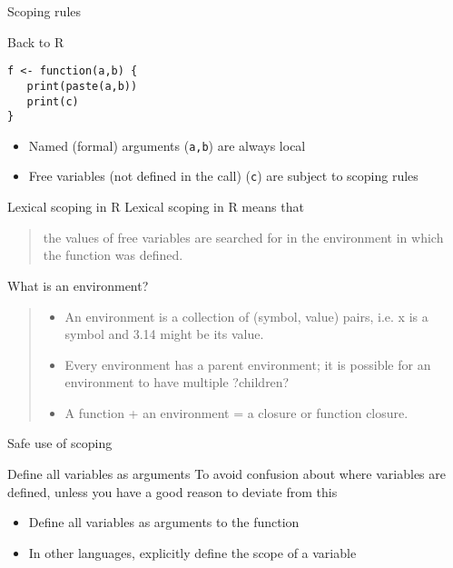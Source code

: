 \documentclass[xcolor=table,compress]{beamer}
\begin{document}
\begin{frame}[fragile]{Scoping rules}
\begin{block}{Back to R}
\begin{lstlisting}[numbers=none]
f <- function(a,b) {
   print(paste(a,b))
   print(c)
}
\end{lstlisting}
\begin{itemize}
\item Named (formal) arguments (\texttt{a,b}) are always local 
\item Free variables (not defined in the call) (\texttt{c}) are subject to scoping rules
\end{itemize}
\end{block}
\end{frame}


\begin{frame}{Lexical scoping in R}
Lexical scoping in R means that 
\begin{quote}
the values of free variables are searched for in the environment in which the
function was defined.
\end{quote}
What is an environment?
\begin{quote}
\begin{itemize}
\item An environment is a collection of (symbol, value) pairs, i.e. x is a symbol and
3.14 might be its value.
\item Every environment has a parent environment; it is possible for an environment to
have multiple ?children?
\item A function + an environment = a closure or function closure.
\end{itemize}
\end{quote}
\end{frame}





\begin{frame}{Safe use of scoping}
\begin{block}{Define all variables as arguments}
To avoid confusion about where variables are defined, unless you have a good reason to deviate from this
\begin{itemize}
\item Define all variables as arguments to the function
\item In other languages, explicitly define the scope of a variable
\end{itemize}
\end{block}
\end{frame}
\end{document}
